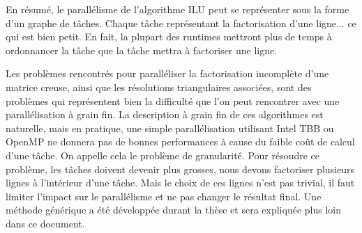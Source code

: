 En résumé, le parallélisme de l'algorithme ILU peut se représenter sous la forme d'un graphe de tâches.
%
Chaque tâche représentant la factorisation d'une ligne... ce qui est bien petit.
%
En fait, la plupart des runtimes mettront plus de temps à ordonnancer la tâche que la tâche mettra à factoriser une ligne.


Les problèmes rencontrés pour paralléliser la factorisation incomplète d'une matrice creuse, ainsi que les résolutions triangulaires associées, sont des problèmes qui représentent bien la difficulté que l'on peut rencontrer avec une parallélisation à grain fin.
%
La description à grain fin de ces algorithmes est naturelle, mais en pratique, une simple parallélisation utilisant Intel TBB ou OpenMP ne donnera pas de bonnes performances à cause du faible coût de calcul d'une tâche.
%
On appelle cela le problème de granularité.
%
Pour résoudre ce problème, les tâches doivent devenir plus grosses, nous devons factoriser plusieurs lignes à l'intérieur d'une tâche.
%
Mais le choix de ces lignes n'est pas trivial, il faut limiter l'impact sur le parallélisme et ne pas changer le résultat final.
%
Une méthode générique a été développée durant la thèse et sera expliquée plus loin dans ce document.
